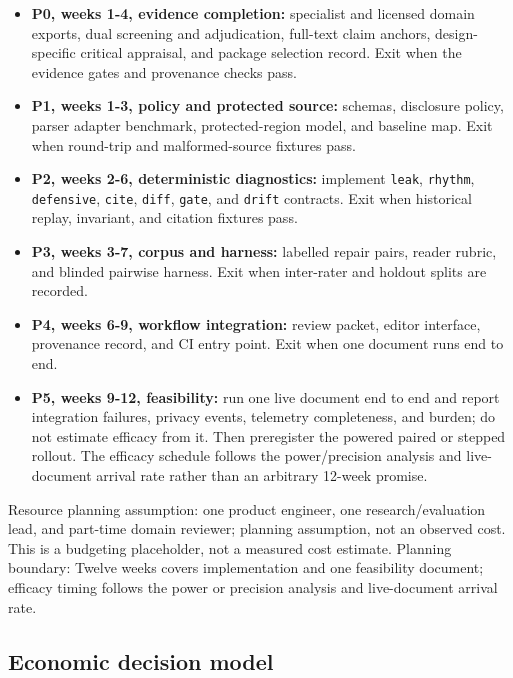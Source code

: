 \documentclass[11pt]{article}
\providecommand{\tightlist}{\setlength{\itemsep}{0pt}\setlength{\parskip}{0pt}}
\begin{document}
\begin{itemize}
\tightlist
\item
  \textbf{P0, weeks 1-4, evidence completion:} specialist and licensed domain exports, dual screening and adjudication, full-text claim anchors, design-specific critical appraisal, and package selection record. Exit when the evidence gates and provenance checks pass.
\item
  \textbf{P1, weeks 1-3, policy and protected source:} schemas, disclosure policy, parser adapter benchmark, protected-region model, and baseline map. Exit when round-trip and malformed-source fixtures pass.
\item
  \textbf{P2, weeks 2-6, deterministic diagnostics:} implement \texttt{leak}, \texttt{rhythm}, \texttt{defensive}, \texttt{cite}, \texttt{diff}, \texttt{gate}, and \texttt{drift} contracts. Exit when historical replay, invariant, and citation fixtures pass.
\item
  \textbf{P3, weeks 3-7, corpus and harness:} labelled repair pairs, reader rubric, and blinded pairwise harness. Exit when inter-rater and holdout splits are recorded.
\item
  \textbf{P4, weeks 6-9, workflow integration:} review packet, editor interface, provenance record, and CI entry point. Exit when one document runs end to end.
\item
  \textbf{P5, weeks 9-12, feasibility:} run one live document end to end and report integration failures, privacy events, telemetry completeness, and burden; do not estimate efficacy from it. Then preregister the powered paired or stepped rollout. The efficacy schedule follows the power/precision analysis and live-document arrival rate rather than an arbitrary 12-week promise.
\end{itemize}

Resource planning assumption: one product engineer, one research/evaluation lead, and part-time domain reviewer; planning assumption, not an observed cost. This is a budgeting placeholder, not a measured cost estimate. Planning boundary: Twelve weeks covers implementation and one feasibility document; efficacy timing follows the power or precision analysis and live-document arrival rate.

\hypertarget{economic-decision-model}{%
\subsection{Economic decision model}\label{economic-decision-model}}
\end{document}
